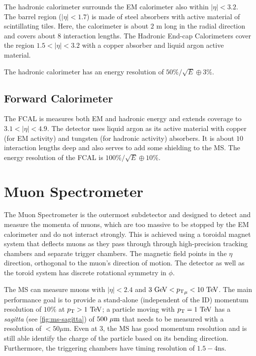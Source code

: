 The hadronic calorimeter surrounds the \ac{EM} calorimeter also within $|\eta| < 3.2$. The barrel region ($|\eta| < 1.7$) is made of steel absorbers with active material of scintillating tiles. Here, the calorimeter is about $2$ m long in the radial direction and covers about $8$ interaction lengths. The Hadronic End-cap Calorimeters cover the region $1.5 < |\eta| < 3.2$ with a copper absorber and liquid argon active material.


The hadronic calorimeter has an energy resolution of  $50\%/\sqrt{E} \oplus 3\%$. 

\subsection{Forward Calorimeter}
The \ac{FCAL} is measures  both \ac{EM} and hadronic energy and extends coverage to $3.1 < |\eta| < 4.9$. The detector uses liquid argon as its active material with copper (for \ac{EM} activity) and tungsten (for hadronic activity) absorbers. It is about $10$ interaction lengths deep and also serves to add some shielding to the \ac{MS}. The energy resolution of the \ac{FCAL} is $100\%/\sqrt{E} \oplus 10\%$.


\section{Muon Spectrometer}
The Muon Spectrometer is the outermost subdetector and designed to detect and measure the momenta of muons, which are too massive to be stopped by the EM calorimeter and do not interact strongly. This is achieved using a toroidal magnet system that deflects muons as they pass through through  high-precision tracking chambers and separate trigger chambers. The magnetic field points in the $\eta$ direction, orthogonal to the muon's direction of motion. The detector as well as the toroid system has discrete rotational symmetry in $\phi$.

The \ac{MS} can measure muons with $|\eta| < 2.4$ and $3 \GeV < {\pt}_{\mu} < 10 \TeV$. The main performance goal is to provide a stand-alone (independent of the \ac{ID}) momentum resolution of $10\%$ at $\pT > 1 \TeV$; a particle moving with $\pt = 1 \TeV$ has a \emph{sagitta} (see \autoref{fig:ms-sagitta}) of $500~\mu\text{m}$ that needs to be measured with a resolution of $<50\mu\textrm{m}$. Even at 3\TeV, the \ac{MS} has good momentum resolution and is still able identify the charge of the particle based on its bending direction. Furthermore, the triggering chambers have timing resolution of $1.5-4 \textrm{ns}$.  

